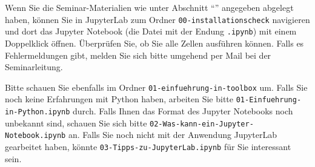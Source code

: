\documentclass[nobib]{tufte-handout}
\begin{document}
Wenn Sie die Seminar-Materialien wie unter Abschnitt \enquote{} angegeben abgelegt haben,
können Sie in JupyterLab zum Ordner 
\texttt{00-installationscheck}
navigieren und dort das Jupyter Notebook (die Datei mit der Endung \texttt{.ipynb}) mit einem Doppelklick öffnen.
Überprüfen Sie, ob Sie alle Zellen ausführen können.
Falls es Fehlermeldungen gibt, melden Sie sich bitte umgehend per Mail bei der Seminarleitung.

Bitte schauen Sie ebenfalls im Ordner
\texttt{01-einfuehrung-in-toolbox}
um.
Falls Sie noch keine Erfahrungen mit Python haben, arbeiten Sie bitte
\texttt{01-Einfuehrung-in-Python.ipynb}
durch.
Falls Ihnen das Format des Jupyter Notebooks noch unbekannt sind, schauen Sie sich bitte
\texttt{02-Was-kann-ein-Jupyter-Notebook.ipynb}
an.
Falls Sie noch nicht mit der Anwendung JupyterLab gearbeitet haben, könnte 
\texttt{03-Tipps-zu-JupyterLab.ipynb}
für Sie interessant sein.

\FloatBarrier{}
\doclicenseThis{}
\end{document}
